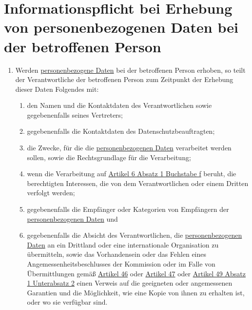 \chapter{Informationspflicht bei Erhebung von personenbezogenen Daten bei der betroffenen Person}
\label{ch:13}


\begin{enumerate}

  \item Werden \hyperref[itm:04-1]{personenbezogene Daten} bei der betroffenen Person erhoben, so teilt der Verantwortliche der betroffenen
   Person zum Zeitpunkt der Erhebung dieser Daten Folgendes mit:
  \label{itm:13-1}

  \begin{enumerate}
  
    \item den Namen und die Kontaktdaten des Verantwortlichen sowie gegebenenfalls seines Vertreters;
    \label{itm:13-1a}

    \item gegebenenfalls die Kontaktdaten des Datenschutzbeauftragten;
    \label{itm:13-1b}

    \item die Zwecke, für die die \hyperref[itm:04-1]{personenbezogenen Daten} verarbeitet werden sollen, sowie die Rechtsgrundlage für die
     Verarbeitung;
    \label{itm:13-1c}

    \item wenn die Verarbeitung auf \hyperref[itm:06-1f]{Artikel 6 Absatz 1 Buchstabe f} beruht, die berechtigten
     Interessen, die von dem Verantwortlichen oder einem Dritten verfolgt werden;
    \label{itm:13-1d}

    \item gegebenenfalls die Empfänger oder Kategorien von Empfängern der \hyperref[itm:04-1]{personenbezogenen Daten} und
    \label{itm:13-1e}

    \item gegebenenfalls die Absicht des Verantwortlichen, die \hyperref[itm:04-1]{personenbezogenen Daten} an ein Drittland oder eine
     internationale Organisation zu übermitteln, sowie das Vorhandensein oder das Fehlen eines
     Angemessenheitsbeschlusses der Kommission oder im Falle von Übermittlungen gemäß \hyperref[ch:46]{Artikel 46} oder
     \hyperref[ch:47]{Artikel 47} oder \hyperref[itm:49-1-2]{Artikel 49 Absatz 1 Unterabsatz 2} einen Verweis auf die
      geeigneten oder angemessenen Garantien und die Möglichkeit, wie eine Kopie von ihnen zu erhalten ist, oder wo sie
      verfügbar sind.
    \label{itm:13-1f}


\end{enumerate}
\end{enumerate}
